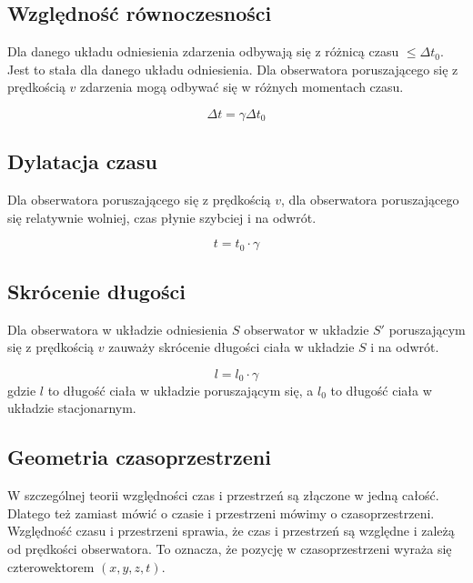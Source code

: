 \documentclass{../notatki}
\begin{document}
\subsection{Względność równoczesności}

Dla danego układu odniesienia zdarzenia odbywają się z różnicą czasu
$\le \Delta t_0$. Jest to stała dla danego układu odniesienia.
Dla obserwatora poruszającego się z prędkością $v$ zdarzenia
mogą odbywać się w różnych momentach czasu.

$$
\Delta t = \gamma \Delta t_0
$$

\subsection{Dylatacja czasu}

Dla obserwatora poruszającego się z prędkością $v$, dla obserwatora
poruszającego
się relatywnie wolniej, czas płynie szybciej i na odwrót.

$$
t = t_0 \cdot \gamma
$$

\subsection{Skrócenie długości}

Dla obserwatora w układzie odniesienia $S$ obserwator w układzie $S'$
poruszającym się z prędkością $v$ zauważy skrócenie długości ciała
w układzie $S$ i na odwrót.

$$
l = l_0 \cdot \gamma
$$
gdzie $l$ to długość ciała w układzie poruszającym się, a $l_0$ to długość
ciała w układzie stacjonarnym.

\subsection{Geometria czasoprzestrzeni}

W szczególnej teorii względności czas i przestrzeń są złączone w jedną
całość. Dlatego też zamiast mówić o czasie i przestrzeni mówimy o
czasoprzestrzeni.
Względność czasu i przestrzeni sprawia, że czas i przestrzeń są względne
i zależą od prędkości obserwatora. To oznacza, że pozycję w czasoprzestrzeni
wyraża się czterowektorem $(x, y, z, t)$.
\end{document}
